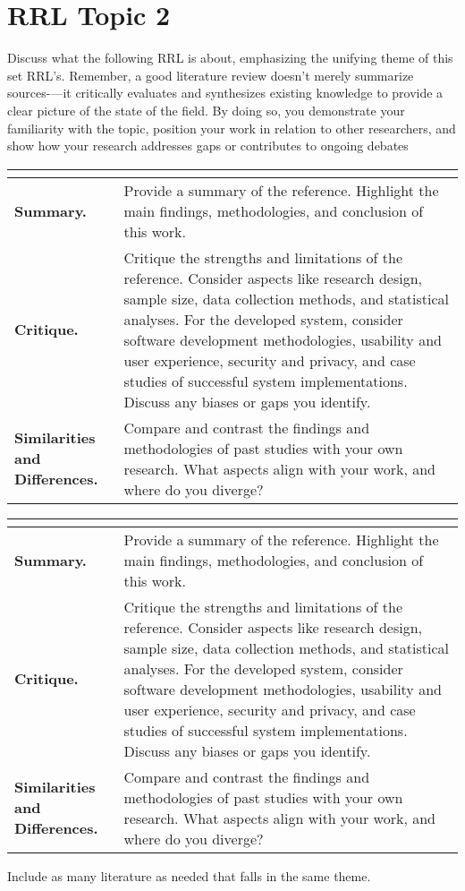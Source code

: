 \section{RRL Topic 2}

Discuss what the following RRL is about, emphasizing the unifying theme of this set RRL's. Remember, a good literature review doesn’t merely summarize sources-—it critically evaluates and synthesizes existing knowledge to provide a clear picture of the state of the field. By doing so, you demonstrate your familiarity with the topic, position your work in relation to other researchers, and show how your research addresses gaps or contributes to ongoing debates

\begin{longtable}{|L{.2\linewidth}|L{.74\linewidth}|}
	\hline
	\\ \hline
	\textbf{Summary.} & Provide a summary of the reference. Highlight the main findings, methodologies, and conclusion of this work.\\ \hline
	\textbf{Critique.} & Critique the strengths and limitations of the reference. Consider aspects like research design, sample size, data collection methods, and statistical analyses. For the developed system, consider software development methodologies, usability and user experience, security and privacy, and case studies of successful system implementations. Discuss any biases or gaps you identify.\\ \hline
	\textbf{Similarities and Differences.} & Compare and contrast the findings and methodologies of past studies with your own research. What aspects align with your work, and where do you diverge?\\ \hline
\end{longtable}

\begin{longtable}{|L{.2\linewidth}|L{.74\linewidth}|}
	\hline
	\\ \hline
	\textbf{Summary.} & Provide a summary of the reference. Highlight the main findings, methodologies, and conclusion of this work.\\ \hline
	\textbf{Critique.} & Critique the strengths and limitations of the reference. Consider aspects like research design, sample size, data collection methods, and statistical analyses. For the developed system, consider software development methodologies, usability and user experience, security and privacy, and case studies of successful system implementations. Discuss any biases or gaps you identify.\\ \hline
	\textbf{Similarities and Differences.} & Compare and contrast the findings and methodologies of past studies with your own research. What aspects align with your work, and where do you diverge?\\ \hline
\end{longtable}

Include as many literature as needed that falls in the same theme.



